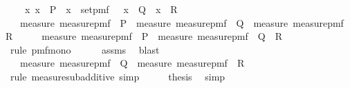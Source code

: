 \begin{isabellebody}
\ \ \ \ {\isachardoublequoteopen}{\isasymAnd}x{\isachardot}{\kern0pt}\ x\ {\isasymin}\ P\ {\isasymLongrightarrow}\ x\ {\isasymin}\ set{\isacharunderscore}{\kern0pt}pmf\ {\isasymOmega}\ {\isasymLongrightarrow}\ x\ {\isasymin}\ Q\ {\isasymor}\ x\ {\isasymin}\ R{\isachardoublequoteclose}\isanewline
\ \ \ {\isachardoublequoteopen}measure\ {\isacharparenleft}{\kern0pt}measure{\isacharunderscore}{\kern0pt}pmf\ {\isasymOmega}{\isacharparenright}{\kern0pt}\ P\ {\isasymle}\ measure\ {\isacharparenleft}{\kern0pt}measure{\isacharunderscore}{\kern0pt}pmf\ {\isasymOmega}{\isacharparenright}{\kern0pt}\ Q\ {\isacharplus}{\kern0pt}\ measure\ {\isacharparenleft}{\kern0pt}measure{\isacharunderscore}{\kern0pt}pmf\ {\isasymOmega}{\isacharparenright}{\kern0pt}\ R{\isachardoublequoteclose}\isanewline
%
\isadelimproof
%
\endisadelimproof
%
\isatagproof
{}\isamarkupfalse%
\ {\isacharminus}{\kern0pt}\isanewline
\ \ \isamarkupfalse%
\ {\isachardoublequoteopen}measure\ {\isacharparenleft}{\kern0pt}measure{\isacharunderscore}{\kern0pt}pmf\ {\isasymOmega}{\isacharparenright}{\kern0pt}\ P\ {\isasymle}\ measure\ {\isacharparenleft}{\kern0pt}measure{\isacharunderscore}{\kern0pt}pmf\ {\isasymOmega}{\isacharparenright}{\kern0pt}\ {\isacharparenleft}{\kern0pt}Q\ {\isasymunion}\ R{\isacharparenright}{\kern0pt}{\isachardoublequoteclose}\isanewline
\ \ \ \ \isamarkupfalse%
\ {\isacharparenleft}{\kern0pt}rule\ pmf{\isacharunderscore}{\kern0pt}mono{\isacharunderscore}{\kern0pt}{}{\isacharparenright}{\kern0pt}\isanewline
\ \ \ \ \isamarkupfalse%
\ assms\ \isamarkupfalse%
\ blast\isanewline
\ \ \isamarkupfalse%
\ \isamarkupfalse%
\ {\isachardoublequoteopen}{\isachardot}{\kern0pt}{\isachardot}{\kern0pt}{\isachardot}{\kern0pt}\ {\isasymle}\ measure\ {\isacharparenleft}{\kern0pt}measure{\isacharunderscore}{\kern0pt}pmf\ {\isasymOmega}{\isacharparenright}{\kern0pt}\ Q\ {\isacharplus}{\kern0pt}\ measure\ {\isacharparenleft}{\kern0pt}measure{\isacharunderscore}{\kern0pt}pmf\ {\isasymOmega}{\isacharparenright}{\kern0pt}\ R{\isachardoublequoteclose}\isanewline
\ \ \ \ \isamarkupfalse%
\ {\isacharparenleft}{\kern0pt}rule\ measure{\isacharunderscore}{\kern0pt}subadditive{\isacharcomma}{\kern0pt}\ simp{\isacharplus}{\kern0pt}{\isacharparenright}{\kern0pt}\isanewline
\ \ \isamarkupfalse%
\ \isamarkupfalse%
\ {\isacharquery}{\kern0pt}thesis\ \isamarkupfalse%
\ simp\isanewline
{}\isamarkupfalse%

\end{isabellebody}
